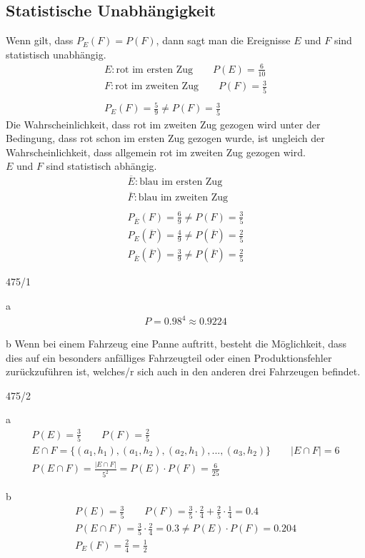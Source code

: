 \subsection{Statistische Unabhängigkeit}
Wenn gilt, dass $P_E(F) = P(F)$, dann sagt man die Ereignisse $E$ und $F$ sind statistisch unabhängig.
\begin{gather*}
  E \colon \text{rot im ersten Zug} \qquad P(E) = \frac{6}{10} \\
  F \colon \text{rot im zweiten Zug} \qquad P(F) = \frac{3}{5} \\\\
  P_E(F) = \frac{5}{9} \neq P(F) = \frac{3}{5}
\end{gather*}
Die Wahrscheinlichkeit, dass rot im zweiten Zug gezogen wird unter der Bedingung, dass rot schon im ersten Zug gezogen wurde, ist ungleich der Wahrscheinlichkeit, dass allgemein rot im zweiten Zug gezogen wird. \\
$E$ und $F$ sind statistisch abhängig. \\
\begin{gather*}
  \overline{E} \colon \text{blau im ersten Zug} \\
  \overline{F} \colon \text{blau im zweiten Zug} \\\\
  P_{\overline{E}}(F) = \frac{6}{9} \neq P(F) = \frac{3}{5} \\
  P_E(\overline{F}) = \frac{4}{9} \neq P(\overline{F}) = \frac{2}{5} \\
  P_{\overline{E}}(\overline{F}) = \frac{3}{9} \neq P(\overline{F}) = \frac{2}{5}
\end{gather*}
\begin{exercise}{475/1}
  \item [a]
  \begin{gather*}
    P = 0.98^4 \approx 0.9224
  \end{gather*}
  \item [b]
  Wenn bei einem Fahrzeug eine Panne auftritt, besteht die Möglichkeit, dass dies auf ein besonders anfälliges Fahrzeugteil oder einen Produktionsfehler zurückzuführen ist, welches/r sich auch in den anderen drei Fahrzeugen befindet.
\end{exercise}
\newpage
\begin{exercise}{475/2}
  \item [a]
  \begin{gather*}
    P(E) = \frac{3}{5} \qquad P(F) = \frac{2}{5} \\
    E \cap F = \{(a_1, h_1), (a_1, h_2), (a_2, h_1), ..., (a_3, h_2)\} \qquad |E \cap F| = 6 \\
    P(E \cap F) = \frac{|E \cap F|}{5^2} = P(E) \cdot P(F) = \frac{6}{25}
  \end{gather*}
  \item [b]
  \begin{gather*}
    P(E) = \frac{3}{5} \qquad P(F) = \frac{3}{5} \cdot \frac{2}{4} + \frac{2}{5} \cdot \frac{1}{4} = 0.4 \\
    P(E \cap F) = \frac{3}{5} \cdot \frac{2}{4} = 0.3 \neq P(E) \cdot P(F) = 0.204 \\
    P_E(F) = \frac{2}{4} = \frac{1}{2}
  \end{gather*}
\end{exercise}

